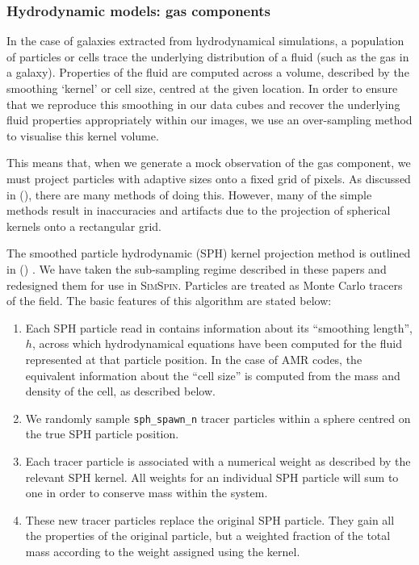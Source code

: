 \documentclass[
  journal=pasa,
  manuscript=research-paper, %
  year=2020,
  volume=37,
]{cup-journal}
\newcommand{\simspin}[1]{\textsc{SimSpin}#1} %
\newcommand{\citetoggle}[1]{\citeauthor{#1} (\citeyear{#1})}
\begin{document}
\subsubsection{Hydrodynamic models: gas components}
\label{sec:gas_ss}

In the case of galaxies extracted from hydrodynamical simulations, a population of particles or cells trace the underlying distribution of a fluid (such as the gas in a galaxy). 
Properties of the fluid are computed across a volume, described by the smoothing `kernel' or cell size, centred at the given location. 
In order to ensure that we reproduce this smoothing in our data cubes and recover the underlying fluid properties appropriately within our images, we use an over-sampling method to visualise this kernel volume.

This means that, when we generate a mock observation of the gas component, we must project particles with adaptive sizes onto a fixed grid of pixels. 
As discussed in \citetoggle{Borrow2021ProjectingEnvironments}, there are many methods of doing this.
However, many of the simple methods result in inaccuracies and artifacts due to the projection of spherical kernels onto a rectangular grid.

The smoothed particle hydrodynamic (SPH) kernel projection method is outlined in \citetoggle{Borrow2021ProjectingEnvironments} \citep[a flavour of which is used in][]{Dolag2005ThePlanck}.
We have taken the sub-sampling regime described in these papers and redesigned them for use in \simspin{}. 
Particles are treated as Monte Carlo tracers of the field. 
The basic features of this algorithm are stated below:

\begin{enumerate}
    \item Each SPH particle read in contains information about its ``smoothing length'', $h$, across which hydrodynamical equations have been computed for the fluid represented at that particle position. In the case of AMR codes, the equivalent information about the ``cell size'' is computed from the mass and density of the cell, as described below. 
    \item We randomly sample \texttt{sph\_spawn\_n} tracer particles within a sphere centred on the true SPH particle position. 
    \item Each tracer particle is associated with a numerical weight as described by the relevant SPH kernel. 
    All weights for an individual SPH particle will sum to one in order to conserve mass within the system.
    \item These new tracer particles replace the original SPH particle. 
    They gain all the properties of the original particle, but a weighted fraction of the total mass according to the weight assigned using the kernel. 
\end{enumerate}
\end{document}

